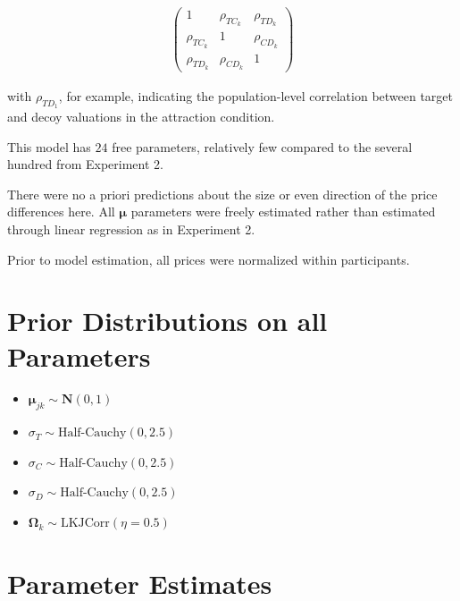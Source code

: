 \begin{align}
   \begin{pmatrix}
      1 & \rho_{TC_k} & \rho_{TD_k} \\
      \rho_{TC_k} & 1 & \rho_{CD_k} \\
      \rho_{TD_k} & \rho_{CD_k} & 1 
   \end{pmatrix}
\end{align}

with $\rho_{TD_1}$, for example, indicating the population-level correlation between target and decoy valuations in the attraction condition.

This model has $24$ free parameters, relatively few compared to the several hundred from Experiment 2.

There were no a priori predictions about the size or even direction of the price differences here. All $\boldsymbol{\mu}$ parameters were freely estimated rather than estimated through linear regression as in Experiment 2.

Prior to model estimation, all prices were normalized within participants. 

\section{Prior Distributions on all Parameters}

\begin{itemize}
    \item $\boldsymbol{\mu}_{jk} \sim \mathcal{\textbf{N}}(0,1)$
    \item $\sigma_{T} \sim \text{Half-Cauchy}(0,2.5)$
    \item $\sigma_{C} \sim \text{Half-Cauchy}(0,2.5)$
    \item $\sigma_{D} \sim \text{Half-Cauchy}(0,2.5)$
    \item $\boldsymbol{\Omega}_{k} \sim \text{LKJCorr}(\eta=0.5)$
\end{itemize}

\section{Parameter Estimates}

